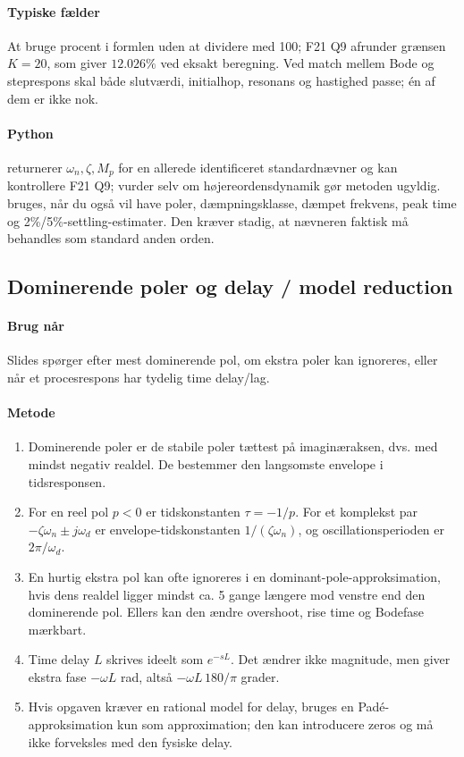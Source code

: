 \paragraph{Typiske fælder}
At bruge procent i formlen uden at dividere med 100; F21 Q9 afrunder grænsen
\(K=20\), som giver \(12.026\%\) ved eksakt beregning. Ved match mellem Bode og
steprespons skal både slutværdi, initialhop, resonans og hastighed passe; én af dem er
ikke nok.

\paragraph{Python}
 returnerer
\(\omega_n,\zeta,M_p\) for en allerede identificeret standardnævner og kan kontrollere
F21 Q9; vurder selv om højereordensdynamik gør metoden ugyldig.
 bruges, når du også vil have poler,
dæmpningsklasse, dæmpet frekvens, peak time og 2\%/5\%-settling-estimater. Den kræver
stadig, at nævneren faktisk må behandles som standard anden orden.

\subsection{Dominerende poler og delay / model reduction}
\label{sec:dominant-delay}

\paragraph{Brug når}
Slides spørger efter mest dominerende pol, om ekstra poler kan ignoreres, eller når et
procesrespons har tydelig time delay/lag.

\paragraph{Metode}
\begin{enumerate}
\item Dominerende poler er de stabile poler tættest på imaginæraksen, dvs. med mindst
      negativ realdel. De bestemmer den langsomste envelope i tidsresponsen.
\item For en reel pol \(p<0\) er tidskonstanten \(\tau=-1/p\). For et komplekst par
      \(-\zeta\omega_n\pm j\omega_d\) er envelope-tidskonstanten
      \(1/(\zeta\omega_n)\), og oscillationsperioden er \(2\pi/\omega_d\).
\item En hurtig ekstra pol kan ofte ignoreres i en dominant-pole-approksimation, hvis
      dens realdel ligger mindst ca. 5 gange længere mod venstre end den dominerende
      pol. Ellers kan den ændre overshoot, rise time og Bodefase mærkbart.
\item Time delay \(L\) skrives ideelt som \(e^{-sL}\). Det ændrer ikke magnitude, men
      giver ekstra fase \(-\omega L\) rad, altså \(-\omega L\,180/\pi\) grader.
\item Hvis opgaven kræver en rational model for delay, bruges en Padé-approksimation
      kun som approximation; den kan introducere zeros og må ikke forveksles med den
      fysiske delay.
\end{enumerate}


